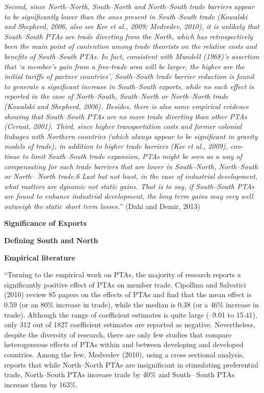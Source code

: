 \documentclass{article}%
\begin{document}
\emph{Second, since North--North, South--North and North--South trade
barriers appear to be significantly lower than the ones present in
South--South trade (Kowalski and Shepherd, 2006, also see Kee et al.,
2009; Medvedev, 2010), it is unlikely that South--South PTAs are trade
diverting from the North, which has retrospectively been the main point
of contention among trade theorists on the relative costs and benefits
of South--South PTAs. In fact, consistent with Mundell (1968)'s
assertion that `a member's gain from a free-trade area will be larger,
the higher are the initial tariffs of partner countries', South--South
trade barrier reduction is found to generate a significant increase in
South--South exports, while no such effect is reported in the case of
North--South, South--North or North--North trade (Kowalski and Shepherd,
2006). Besides, there is also some empirical evidence showing that
South--South PTAs are no more trade diverting than other PTAs (Cernat,
2001). Third, since higher transportation costs and former colonial
linkages with Northern countries (which always appear to be significant
in gravity models of trade), in addition to higher trade barriers (Kee
et al., 2009), con- tinue to limit South--South trade expansion, PTAs
might be seen as a way of compensating for such trade barriers that are
lower in South--North, North--South or North-- North trade.6 Last but
not least, in the case of industrial development, what matters are
dynamic not static gains. That is to say, if South--South PTAs are found
to enhance industrial development, the long term gains may very well
outweigh the static short term losses.}'' (Dahi and Demir, 2013)

\textbf{Significance of Exports}

\textbf{Defining South and North}

\textbf{Empirical literature}

``Turning to the empirical work on PTAs, the majority of research
reports a significantly positive effect of PTAs on member trade.
Cipollina and Salvatici (2010) review 85 papers on the effects of PTAs
and find that the mean effect is 0.59 (or an 80\% increase in trade),
while the median is 0.38 (or a 46\% increase in trade). Although the
range of coefficient estimates is quite large (--9.01 to 15.41), only
312 out of 1827 coefficient estimates are reported as negative.
Nevertheless, despite the diversity of research, there are only few
studies that compare heterogeneous effects of PTAs within and between
developing and developed countries. Among the few, Medvedev (2010),
using a cross sectional analysis, reports that while North--North PTAs
are insignificant in stimulating preferential trade, North--South PTAs
increase trade by 40\% and South-- South PTAs increase them by 163\%.
\end{document}
